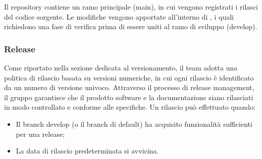 \vspace{0.5\baselineskip}
\par Il repository contiene un ramo principale (main), in cui vengono registrati i rilasci del codice sorgente. Le modifiche vengono apportate all'interno di , i quali richiedono una fase di verifica prima di essere uniti al ramo di sviluppo (develop).

\subsubsection{Release}
\par Come riportato nella sezione dedicata al versionamento, il team adotta una politica di rilascio basata su versioni numeriche, in cui ogni rilascio è identificato da un numero di versione univoco. Attraverso il processo di release management, il gruppo garantisce che il prodotto software e la documentazione siano rilasciati in modo controllato e conforme alle specifiche. Un rilascio può effettuato quando:
\begin{itemize}
  \item Il branch develop (o il branch di default) ha acquisito funzionalità sufficienti per una release;
  \item La data di rilascio predeterminata si avvicina.
\end{itemize}

